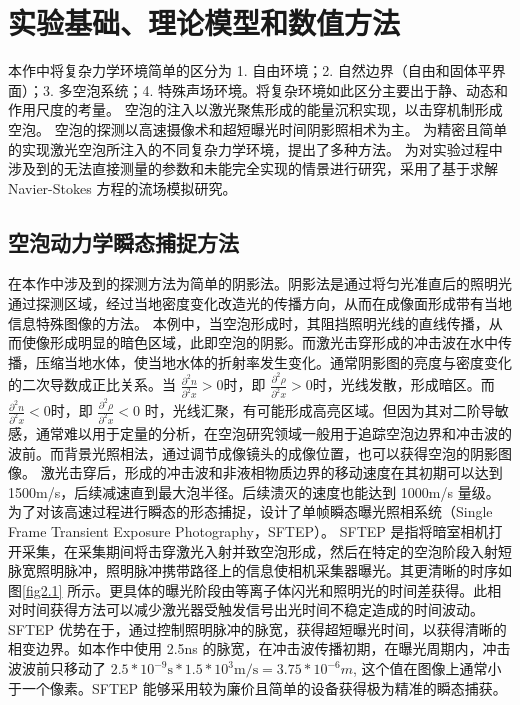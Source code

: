 \chapter{实验基础、理论模型和数值方法}\label{chap:chap2}


本作中将复杂力学环境简单的区分为 1. 自由环境；2.
自然边界（自由和固体平界面）；3. 多空泡系统；4.
特殊声场环境。将复杂环境如此区分主要出于静、动态和作用尺度的考量。
空泡的注入以激光聚焦形成的能量沉积实现，以击穿机制形成空泡。
空泡的探测以高速摄像术和超短曝光时间阴影照相术为主。
为精密且简单的实现激光空泡所注入的不同复杂力学环境，提出了多种方法。
为对实验过程中涉及到的无法直接测量的参数和未能完全实现的情景进行研究，采用了基于求解
Navier-Stokes 方程的流场模拟研究。


\section{空泡动力学瞬态捕捉方法}

在本作中涉及到的探测方法为简单的阴影法。阴影法是通过将匀光准直后的照明光通过探测区域，经过当地密度变化改造光的传播方向，从而在成像面形成带有当地信息特殊图像的方法。
本例中，当空泡形成时，其阻挡照明光线的直线传播，从而使像形成明显的暗色区域，此即空泡的阴影。而激光击穿形成的冲击波在水中传播，压缩当地水体，使当地水体的折射率发生变化。通常阴影图的亮度与密度变化的二次导数成正比关系。当
$\frac {\partial ^2 n}{\partial ^2 x}>0$时，即
 $\frac {\partial ^2 \rho}{\partial ^2 x}>0$时，光线发散，形成暗区。而
$\frac {\partial ^2 n}{\partial ^2 x}<0$时，即
$\frac {\partial ^2 \rho}{\partial ^2 x}<0$
时，光线汇聚，有可能形成高亮区域。但因为其对二阶导敏感，通常难以用于定量的分析，在空泡研究领域一般用于追踪空泡边界和冲击波的波前。而背景光照相法，通过调节成像镜头的成像位置，也可以获得空泡的阴影图像。
激光击穿后，形成的冲击波和非液相物质边界的移动速度在其初期可以达到
1500m/s，后续减速直到最大泡半径。后续溃灭的速度也能达到 1000m/s
量级。为了对该高速过程进行瞬态的形态捕捉，设计了单帧瞬态曝光照相系统（Single
Frame Transient Exposure Photography，SFTEP）。 SFTEP
是指将暗室相机打开采集，在采集期间将击穿激光入射并致空泡形成，然后在特定的空泡阶段入射短脉宽照明脉冲，照明脉冲携带路径上的信息使相机采集器曝光。其更清晰的时序如图\ref{fig2.1}
所示。更具体的曝光阶段由等离子体闪光和照明光的时间差获得。此相对时间获得方法可以减少激光器受触发信号出光时间不稳定造成的时间波动。
SFTEP
优势在于，通过控制照明脉冲的脉宽，获得超短曝光时间，以获得清晰的相变边界。如本作中使用
2.5ns 的脉宽，在冲击波传播初期，在曝光周期内，冲击波波前只移动了
$2.5*10^{-9}\mathrm s*1.5*10^3 \mathrm {m/s}=3.75*10^{-6}m$,
这个值在图像上通常小于一个像素。SFTEP
能够采用较为廉价且简单的设备获得极为精准的瞬态捕获。

